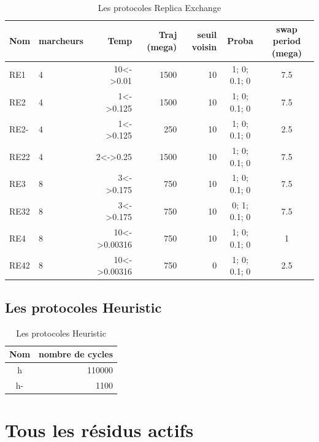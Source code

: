 \documentclass[a4paper,12pt]{article}
\begin{document}
    \begin{table}[!htbp]
      \centering

      \begin{tabular}{|l|l|r|r|r|c|c|}

        \hline
        Nom & marcheurs &Temp & Traj (mega)& seuil voisin  & Proba & swap period (mega)\\
        \hline
        RE1   & 4 & 10<->0.01    &  1500 & 10 & 1; 0; 0.1; 0 &  7.5\\  
        RE2   & 4 & 1<->0.125    &  1500 & 10 & 1; 0; 0.1; 0 &  7.5\\  
        RE2-  & 4 & 1<->0.125    &  250  & 10 & 1; 0; 0.1; 0 &  2.5\\  
        RE22  & 4 & 2<->0.25     &  1500 & 10 & 1; 0; 0.1; 0 &  7.5\\  
        RE3   & 8 & 3<->0.175    &  750  & 10 & 1; 0; 0.1; 0 &  7.5\\
        RE32  & 8 & 3<->0.175    &  750  & 10 & 0; 1; 0.1; 0 &  7.5\\
        RE4   & 8 & 10<->0.00316 &  750  & 10 & 1; 0; 0.1; 0 &  1\\  
        RE42  & 8 & 10<->0.00316 &  750  &  0 & 1; 0; 0.1; 0 &  2.5\\  \hline

      \end{tabular}      
      \caption{Les protocoles Replica Exchange}
      \label{tab_protoRE}      
    \end{table}


   \subsection{Les protocoles Heuristic} 
    
    \begin{table}[!htbp]
      \centering

      \begin{tabular}{|c|r|}

        \hline
        Nom & nombre de cycles \\
        \hline
        h   & 110000 \\  
        h-  & 1100   \\  \hline

      \end{tabular}      
      \caption{Les protocoles Heuristic}
      \label{tab_protoH}      
    \end{table}

   \section{Tous les résidus actifs} 
\end{document}
